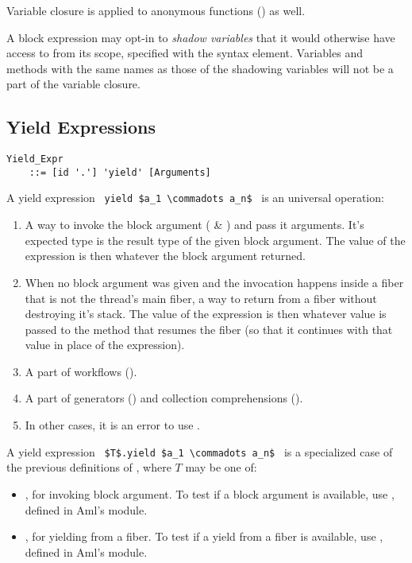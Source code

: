 Variable closure is applied to anonymous functions () as well. 

A block expression may opt-in to {\em shadow variables} that it would otherwise have access to from its scope, specified with the  syntax element. Variables and methods with the same names as those of the shadowing variables will not be a part of the variable closure. 





\subsection{Yield Expressions}
\label{sec:yield-expressions}

\grammar\begin{lstlisting}
Yield_Expr 
    ::= [id '.'] 'yield' [Arguments]
\end{lstlisting}

A yield expression ~\lstinline!yield $a_1 \commadots a_n$!~ is an universal  operation:
\begin{enumerate}
  \item A way to invoke the block argument ( \& ) and pass it arguments. It's expected type is the result type of the given block argument. The value of the expression is then whatever the block argument returned. 
  \item When no block argument was given and the invocation happens inside a fiber that is not the thread's main fiber, a way to return from a fiber without destroying it's stack. The value of the expression is then whatever value is passed to the method that resumes the fiber (so that it continues with that value in place of the  expression). 
  \item A part of workflows ().
  \item A part of generators () and collection comprehensions ().
  \item In other cases, it is an error to use . 
\end{enumerate}

A yield expression ~\lstinline!$T$.yield $a_1 \commadots a_n$!~ is a specialized case of the previous definitions of , where $T$ may be one of:
\begin{itemize}
  \item {}, for invoking block argument. To test if a block argument is available, use , defined in Aml's  module. 
  \item {}, for yielding from a fiber. To test if a yield from a fiber is available, use , defined in Aml's  module. 
\end{itemize}





